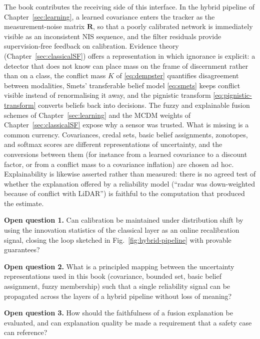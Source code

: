 The book contributes the receiving side of this interface. In the hybrid pipeline of Chapter~\ref{sec:learning}, a learned covariance enters the tracker as the measurement-noise matrix $\mathbf{R}$, so that a poorly calibrated network is immediately visible as an inconsistent NIS sequence, and the filter residuals provide supervision-free feedback on calibration. Evidence theory (Chapter~\ref{sec:classicalSF}) offers a representation in which ignorance is explicit: a detector that does not know can place mass on the frame of discernment rather than on a class, the conflict mass $K$ of \eqref{eq:dempster} quantifies disagreement between modalities, Smets' transferable belief model \eqref{eq:smets} keeps conflict visible instead of renormalising it away, and the pignistic transform \eqref{eq:pignistic-transform} converts beliefs back into decisions. The fuzzy and explainable fusion schemes of Chapter~\ref{sec:learning} and the MCDM weights of Chapter~\ref{sec:classicalSF} expose why a sensor was trusted. What is missing is a common currency. Covariances, credal sets, basic belief assignments, zonotopes, and softmax scores are different representations of uncertainty, and the conversions between them (for instance from a learned covariance to a discount factor, or from a conflict mass to a covariance inflation) are chosen ad hoc. Explainability is likewise asserted rather than measured: there is no agreed test of whether the explanation offered by a reliability model (``radar was down-weighted because of conflict with LiDAR'') is faithful to the computation that produced the estimate.

\begin{list4a}
    \item \textbf{Open question 1.} Can calibration be maintained under distribution shift by using the innovation statistics of the classical layer as an online recalibration signal, closing the loop sketched in Fig.~\ref{fig:hybrid-pipeline} with provable guarantees?
    \item \textbf{Open question 2.} What is a principled mapping between the uncertainty representations used in this book (covariance, bounded set, basic belief assignment, fuzzy membership) such that a single reliability signal can be propagated across the layers of a hybrid pipeline without loss of meaning?
    \item \textbf{Open question 3.} How should the faithfulness of a fusion explanation be evaluated, and can explanation quality be made a requirement that a safety case can reference?
\end{list4a}

